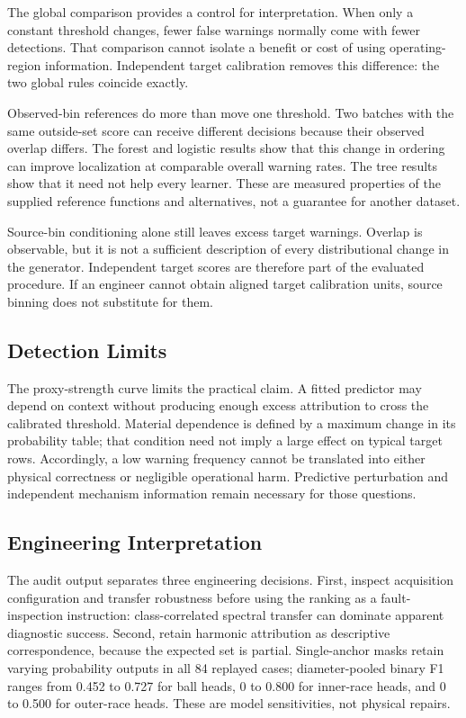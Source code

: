 \documentclass[conference]{IEEEtran}
\begin{document}
The global comparison provides a control for interpretation. When only a constant threshold changes, fewer false warnings normally come with fewer detections. That comparison cannot isolate a benefit or cost of using operating-region information. Independent target calibration removes this difference: the two global rules coincide exactly.

Observed-bin references do more than move one threshold. Two batches with the same outside-set score can receive different decisions because their observed overlap differs. The forest and logistic results show that this change in ordering can improve localization at comparable overall warning rates. The tree results show that it need not help every learner. These are measured properties of the supplied reference functions and alternatives, not a guarantee for another dataset.

Source-bin conditioning alone still leaves excess target warnings. Overlap is observable, but it is not a sufficient description of every distributional change in the generator. Independent target scores are therefore part of the evaluated procedure. If an engineer cannot obtain aligned target calibration units, source binning does not substitute for them.

\subsection{Detection Limits}
The proxy-strength curve limits the practical claim. A fitted predictor may depend on context without producing enough excess attribution to cross the calibrated threshold. Material dependence is defined by a maximum change in its probability table; that condition need not imply a large effect on typical target rows. Accordingly, a low warning frequency cannot be translated into either physical correctness or negligible operational harm. Predictive perturbation and independent mechanism information remain necessary for those questions.

\subsection{Engineering Interpretation}
The audit output separates three engineering decisions. First, inspect acquisition configuration and transfer robustness before using the ranking as a fault-inspection instruction: class-correlated spectral transfer can dominate apparent diagnostic success. Second, retain harmonic attribution as descriptive correspondence, because the expected set is partial. Single-anchor masks retain varying probability outputs in all 84 replayed cases; diameter-pooled binary F1 ranges from 0.452 to 0.727 for ball heads, 0 to 0.800 for inner-race heads, and 0 to 0.500 for outer-race heads. These are model sensitivities, not physical repairs.
\end{document}
